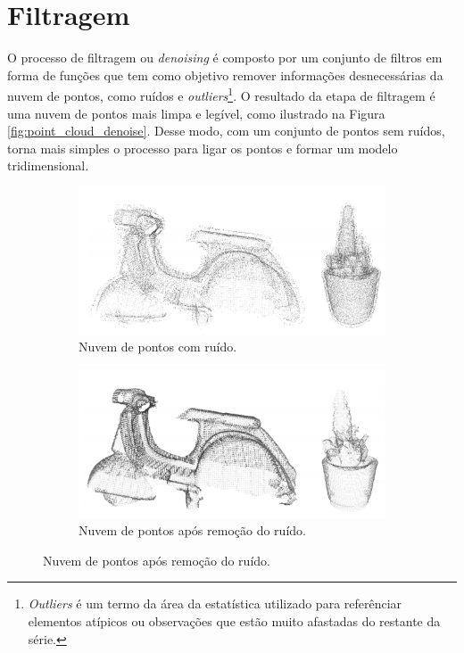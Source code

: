 \section{Filtragem}
\label{sec:filtragem}

O processo de filtragem ou \textit{denoising} é composto por um conjunto de filtros em forma de funções que tem como objetivo remover informações desnecessárias da nuvem de pontos, como ruídos e \textit{outliers}\footnote{\textit{Outliers} é um termo da área da estatística utilizado para referênciar elementos atípicos ou observações que estão muito afastadas do restante da série.}.
O resultado da etapa de filtragem é uma nuvem de pontos mais limpa e legível, como ilustrado na Figura \ref{fig:point_cloud_denoise}. 
Desse modo, com um conjunto de pontos sem ruídos, torna mais simples o processo para ligar os pontos e formar um modelo tridimensional.

\begin{figure}[H]
    \centering
    \caption{Remoção de ruído em uma nuvem de pontos.}
    \label{fig:point_cloud_denoise}
    \begin{subfigure}[t]{0.45\textwidth}
        \includegraphics[width=\textwidth]{dados/figuras/noised.png}
        \caption{Nuvem de pontos com ruído.}
    \end{subfigure}
    \hspace{3em}
    \begin{subfigure}[t]{0.45\textwidth}
        \includegraphics[width=\textwidth]{dados/figuras/denoised.png}
        \caption{Nuvem de pontos após remoção do ruído.}
    \end{subfigure}
\end{figure}

